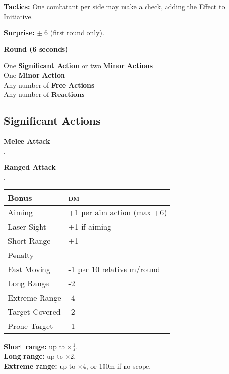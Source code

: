 \documentclass{cheatsheet}
\begin{document}
\begin{multicols}{3}
\begin{emphbox}
  \begin{center}
  \end{center}

  \textbf{Tactics:} One combatant per side may make a check, adding
  the Effect to Initiative.

  \textbf{Surprise:} $\pm$ 6 (first round only).

  \begin{center}
    \textbf{Round (6 seconds)}
  \end{center}

  One \textbf{Significant Action} or two \textbf{Minor Actions}\\
  One \textbf{Minor Action}\\
  Any number of \textbf{Free Actions}\\
  Any number of \textbf{Reactions}
\end{emphbox}

\subsection{Significant Actions}

\textbf{Melee Attack}\\
.

\textbf{Ranged Attack}\\
.

\begin{tabularx}{\linewidth}{lX} \toprule
Bonus & \textsc{dm} \\ \midrule
Aiming & +1 per aim action (max +6) \\
Laser Sight & +1 if aiming \\
Short Range & +1 \\ \midrule
Penalty & \\ \midrule
Fast Moving & -1 per 10 relative m/round \\
Long Range & -2 \\
Extreme Range & -4 \\
Target Covered & -2 \\
Prone Target & -1 \\ \bottomrule
\end{tabularx}

\textbf{Short range:} up to $\times\frac{1}{4}$.\\
\textbf{Long range:} up to $\times 2$.\\
\textbf{Extreme range:} up to $\times 4$, or 100m if no scope.


\end{multicols}
\end{document}
